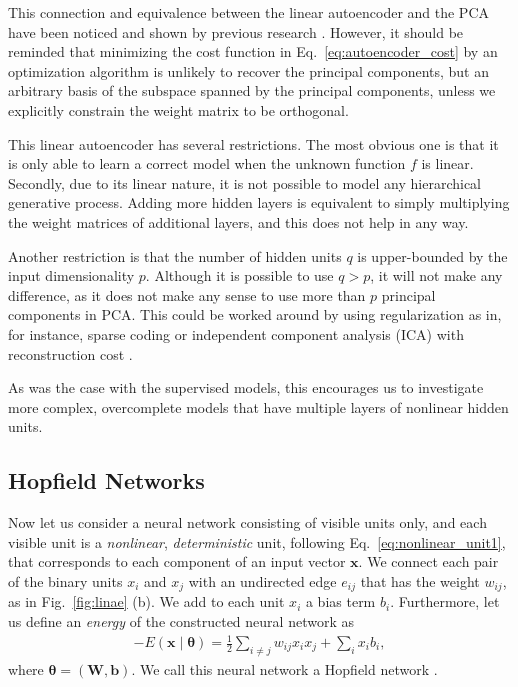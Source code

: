 \documentclass{now}
\newcommand{\vect}[1]{\mathbf{#1}}
\newcommand{\vects}[1]{\boldsymbol{#1}}
\newcommand{\matr}[1]{\mathbf{#1}}
\newcommand{\vb}[0]{\vect{b}}
\newcommand{\vx}[0]{\vect{x}}
\newcommand{\mW}[0]{\matr{W}}
\newcommand{\TT}[0]{{\vects{\theta}}}
\begin{document}
This connection and equivalence between the linear
autoencoder and the PCA have been noticed and shown by
previous research \citep[see, for
instance,][]{Oja1982,Baldi1989}. However, it should be
reminded that minimizing the cost function in
Eq.~\eqref{eq:autoencoder_cost} by an optimization
algorithm is unlikely to recover the principal components,
but an arbitrary basis of the subspace spanned by the
principal components, unless we explicitly constrain the
weight matrix to be orthogonal.

This linear autoencoder has several restrictions.  The most
obvious one is that it is only able to learn a correct model
when the unknown function $f$ is linear. 
Secondly, due to its linear nature, it is not possible to
model any hierarchical generative process. Adding more
hidden layers is equivalent to simply multiplying the weight
matrices of additional layers, and this does not help in
any way.

Another restriction is that the number of hidden units $q$
is upper-bounded by the input dimensionality $p$. Although it
is possible to use $q > p$, it will not make any difference,
as it does not make any sense to use more than $p$ principal
components in PCA.  This could be worked around by using
regularization as in, for instance, sparse coding
\citep{Olshausen1996} or independent component analysis
(ICA) with reconstruction cost \citep{Le2011op}. 

As was the case with the supervised models, this encourages
us to investigate more complex, overcomplete models that
have multiple layers of nonlinear hidden units.


\subsection{Hopfield Networks}
\label{sec:hopfield_network}

Now let us consider a neural network consisting of visible
units only, and each visible unit is a \textit{nonlinear},
\textit{deterministic} unit, following
Eq.~\eqref{eq:nonlinear_unit1}, that corresponds to each
component of an input vector $\vx$. We connect each pair of
the binary units $x_i$ and $x_j$ with an undirected edge $e_{ij}$
that has the weight $w_{ij}$, as in Fig.~\ref{fig:linae}
(b).  We add to each unit $x_i$ a bias term $b_i$.
Furthermore, let us define an \textit{energy} of the
constructed neural network as
\begin{align}
    \label{eq:hopfield_energy}
    -E(\vx \mid \TT) = \frac{1}{2} \sum_{i \neq j} w_{ij}
    x_i x_j + \sum_i x_i b_i,
\end{align}
where $\TT = \left( \mW, \vb \right)$.  We call this neural
network a Hopfield network \citep{Hopfield1982}.
\end{document}
